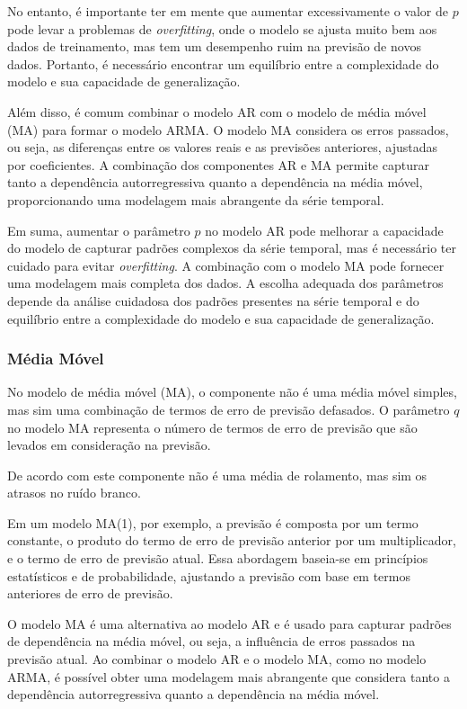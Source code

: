 No entanto, é importante ter em mente que aumentar excessivamente o valor de $p$ pode levar a problemas de \textit{overfitting}, onde o modelo se ajusta muito bem aos dados de treinamento, mas tem um desempenho ruim na previsão de novos dados. Portanto, é necessário encontrar um equilíbrio entre a complexidade do modelo e sua capacidade de generalização.

Além disso, é comum combinar o modelo AR com o modelo de média móvel (MA) para formar o modelo ARMA. O modelo MA considera os erros passados, ou seja, as diferenças entre os valores reais e as previsões anteriores, ajustadas por coeficientes. A combinação dos componentes AR e MA permite capturar tanto a dependência autorregressiva quanto a dependência na média móvel, proporcionando uma modelagem mais abrangente da série temporal.

Em suma, aumentar o parâmetro $p$ no modelo AR pode melhorar a capacidade do modelo de capturar padrões complexos da série temporal, mas é necessário ter cuidado para evitar \textit{overfitting}. A combinação com o modelo MA pode fornecer uma modelagem mais completa dos dados. A escolha adequada dos parâmetros depende da análise cuidadosa dos padrões presentes na série temporal e do equilíbrio entre a complexidade do modelo e sua capacidade de generalização.

\subsubsection{M\'edia M\'ovel}\label{subsubsec:ma}
No modelo de média móvel (MA), o componente não é uma média móvel simples, mas sim uma combinação de termos de erro de previsão defasados. O parâmetro $q$ no modelo MA representa o número de termos de erro de previsão que são levados em consideração na previsão.

De acordo com  este componente não é uma média de rolamento, mas sim os atrasos no ruído branco.

Em um modelo MA(1), por exemplo, a previsão é composta por um termo constante, o produto do termo de erro de previsão anterior por um multiplicador, e o termo de erro de previsão atual. Essa abordagem baseia-se em princípios estatísticos e de probabilidade, ajustando a previsão com base em termos anteriores de erro de previsão.

O modelo MA é uma alternativa ao modelo AR e é usado para capturar padrões de dependência na média móvel, ou seja, a influência de erros passados na previsão atual. Ao combinar o modelo AR e o modelo MA, como no modelo ARMA, é possível obter uma modelagem mais abrangente que considera tanto a dependência autorregressiva quanto a dependência na média móvel.

